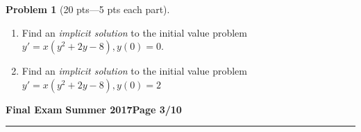 \documentclass[12pt]{article}
\theoremstyle{definition}
\newtheorem{problem}{Problem}
\begin{document}
\begin{problem}[20 pts---5 pts each part]
\begin{enumerate}
\begin{flushright}
  \end{flushright}
  \item Find an \emph{implicit solution} to the initial value problem $y'=x(y^2+2y-8), y(0)=0$.
  \vspace{5.5cm}
  \begin{flushright}
  \end{flushright}
  \item Find an \emph{implicit solution} to the initial value problem $y'=x(y^2+2y-8), y(0)=2$
  \begin{flushright}
  \end{flushright}
\end{enumerate}
\end{problem} 

\newpage

\hfill{\large\bf Final Exam}\hfill{\large\bf
Summer 2017}\hfill{\large\bf Page 3/10}\hrule
\end{document}
